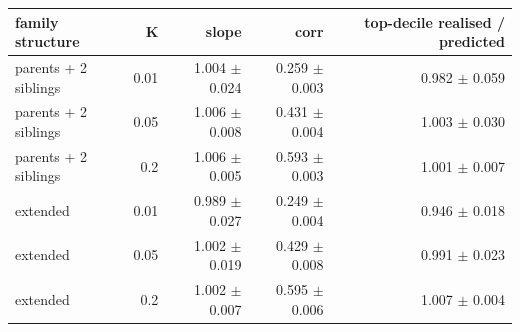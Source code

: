 \begin{tabular}{lrrrr}
\toprule
family structure & K & slope & corr & top-decile realised / predicted \\
\midrule
parents + 2 siblings & 0.01 & 1.004 $\pm$ 0.024 & 0.259 $\pm$ 0.003 & 0.982 $\pm$ 0.059 \\
parents + 2 siblings & 0.05 & 1.006 $\pm$ 0.008 & 0.431 $\pm$ 0.004 & 1.003 $\pm$ 0.030 \\
parents + 2 siblings & 0.2 & 1.006 $\pm$ 0.005 & 0.593 $\pm$ 0.003 & 1.001 $\pm$ 0.007 \\
extended & 0.01 & 0.989 $\pm$ 0.027 & 0.249 $\pm$ 0.004 & 0.946 $\pm$ 0.018 \\
extended & 0.05 & 1.002 $\pm$ 0.019 & 0.429 $\pm$ 0.008 & 0.991 $\pm$ 0.023 \\
extended & 0.2 & 1.002 $\pm$ 0.007 & 0.595 $\pm$ 0.006 & 1.007 $\pm$ 0.004 \\
\bottomrule
\end{tabular}
